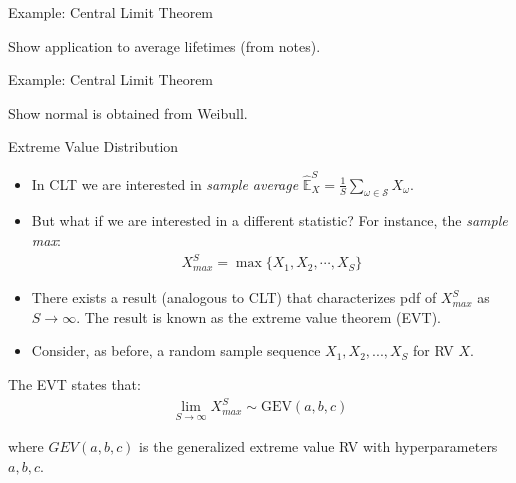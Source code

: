 \documentclass[9pt]{beamer}
\begin{document}
%
\begin{frame}{Example: Central Limit Theorem}

\begin{block}{}
{\color{red} Show application to average lifetimes (from notes).}
\end{block}

\end{frame}

%
\begin{frame}{Example: Central Limit Theorem}

\begin{block}{}
{\color{red} Show normal is obtained from Weibull.}
\end{block}

\end{frame}

%
\begin{frame}{Extreme Value Distribution}

\begin{itemize}
\item In CLT we are interested in {\em sample average} $\hat{\mathbb{E}}_X^S=\frac{1}{S}\sum_{\omega\in \mathcal{S}}X_\omega$. 

\item But what if we are interested in a different statistic? For instance, the {\em sample max}:
\begin{align*}
X_{max}^S=\max\{X_1,X_2,\cdots, X_S\}
\end{align*}

\item There exists a result (analogous to CLT) that characterizes pdf of $X_{max}^S$ as $S\to \infty$.  The result is known as the extreme value theorem (EVT).

\item Consider, as before, a random sample sequence $X_1,X_2,...,X_S$ for RV $X$. 

\end{itemize}

\begin{block}{}
The EVT states that:
\begin{align*}
\lim_{S\to \infty}X_{max}^S\sim \textrm{GEV}(a,b,c)
\end{align*}
\end{block}
where $GEV(a,b,c)$ is the generalized extreme value RV with hyperparameters $a,b,c$. 

\end{frame}
\end{document}
